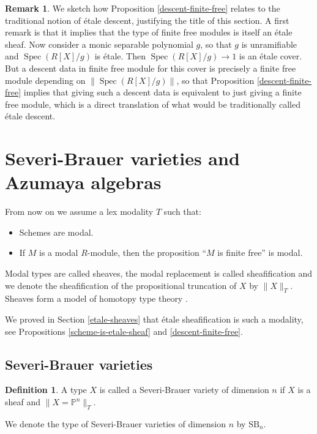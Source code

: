 \documentclass[10pt,a4paper]{article}
\theoremstyle{definition}
\newtheorem{definition}[theorem]{Definition}
\newtheorem{remark}[theorem]{Remark}
\DeclareMathOperator{\Spec}{Spec}
\newcommand{\SB}{\mathrm{SB}}
\newcommand{\propTrunc}[1]{\lVert #1 \rVert}
\newcommand{\bP}{\mathbb{P}}
\begin{document}
\begin{remark}
We sketch how Proposition \ref{descent-finite-free} relates to the traditional notion of étale descent, justifying the title of this section. 
A first remark is that it implies that the type of finite free modules is itself an étale sheaf. Now consider a monic separable polynomial $g$, so that $g$ is unramifiable and $\Spec(R[X]/g)$ is étale. Then $\Spec(R[X]/g)\to 1$ is an étale cover. But a descent data in finite free module for this cover is precisely a finite free module depending on 
$\propTrunc{\Spec(R[X]/g)}$, so that Proposition \ref{descent-finite-free} implies that giving such a descent data is equivalent to just giving a finite free module, which is a direct translation of what would be traditionally called étale descent.
\end{remark}



\section{Severi-Brauer varieties and Azumaya algebras}

From now on we assume a lex modality $T$ such that:
\begin{itemize}
\item Schemes are modal.
\item If $M$ is a modal $R$-module, then the proposition ``$M$ is finite free'' is modal.
\end{itemize}
Modal types are called sheaves, the modal replacement is called sheafification and we denote the sheafification of the propositional truncation of $X$ by $\propTrunc{X}_T$. Sheaves form a model of homotopy type theory \cite{modalities,Quirin16}.

We proved in Section \ref{etale-sheaves} that étale sheafification is such a modality, see Propositions \ref{scheme-is-etale-sheaf} and \ref{descent-finite-free}.


\subsection{Severi-Brauer varieties}

\begin{definition}
A type $X$ is called a Severi-Brauer variety of dimension $n$ if $X$ is a sheaf and $\propTrunc{X=\bP^n}_T$.
\end{definition}

We denote the type of Severi-Brauer varieties of dimension $n$ by $\SB_n$.
\end{document}
